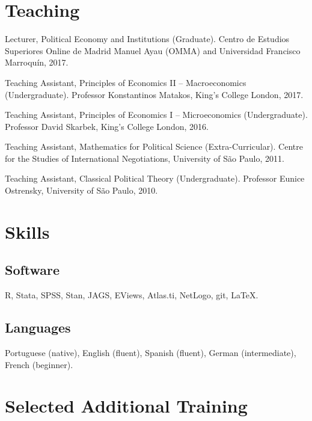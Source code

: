 \documentclass[letterpaper]{article}
\renewenvironment{itemize}{
  \begin{list}{}{
    \setlength{\leftmargin}{1.5em}
  }
}{
  \end{list}
}
\begin{document}
\section*{Teaching}

\begin{itemize}
	\item Lecturer, Political Economy and Institutions (Graduate). Centro de Estudios Superiores Online de Madrid Manuel Ayau (OMMA) and Universidad Francisco Marroquín, 2017.
	\item Teaching Assistant, Principles of Economics II -- Macroeconomics (Undergraduate). Professor Konstantinos Matakos, King's College London, 2017.
	\item Teaching Assistant, Principles of Economics I -- Microeconomics (Undergraduate). Professor David Skarbek, King's College London, 2016.
	\item Teaching Assistant, Mathematics for Political Science (Extra-Curricular). Centre for the Studies of International Negotiations, University of S\~{a}o Paulo, 2011.
	\item Teaching Assistant, Classical Political Theory (Undergraduate). Professor Eunice Ostrensky, University of S\~{a}o Paulo, 2010.
\end{itemize}

\section*{Skills}

\subsection*{Software}

\begin{itemize}
	\item R, Stata, SPSS, Stan, JAGS, EViews, Atlas.ti, NetLogo, git, \LaTeX{}.
\end{itemize}

\subsection*{Languages}

\begin{itemize}
	\item Portuguese (native), English (fluent), Spanish (fluent), German (intermediate), French (beginner).
\end{itemize}

\section*{Selected Additional Training}
\end{document}
